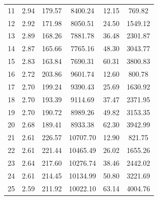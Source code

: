 {\begin{longtable}{|c|c|c|c|c|c|}
    11           & 2.94            & 179.57          & 8400.24             & 12.15           & 769.82              \\
    12           & 2.92            & 171.98          & 8050.51             & 24.50           & 1549.12             \\
    13           & 2.89            & 168.26          & 7881.78             & 36.48           & 2301.87             \\
    14           & 2.87            & 165.66          & 7765.16             & 48.30           & 3043.77             \\
    15           & 2.83            & 163.84          & 7690.31             & 60.31           & 3800.83             \\ \hline
    16           & 2.72            & 203.86          & 9601.74             & 12.60           & 800.78              \\
    17           & 2.70            & 199.24          & 9390.43             & 25.69           & 1630.92             \\
    18           & 2.70            & 193.39          & 9114.69             & 37.47           & 2371.95             \\
    19           & 2.70            & 190.72          & 8989.26             & 49.82           & 3153.35             \\
    20           & 2.68            & 189.41          & 8933.38             & 62.30           & 3942.99             \\ \hline
    21           & 2.61            & 226.57          & 10707.70            & 12.90           & 821.75              \\
    22           & 2.61            & 221.44          & 10465.49            & 26.02           & 1655.26             \\
    23           & 2.64            & 217.60          & 10276.74            & 38.46           & 2442.02             \\
    24           & 2.61            & 214.45          & 10134.99            & 50.80           & 3221.69             \\
    25           & 2.59            & 211.92          & 10022.10            & 63.14           & 4004.76             \\ \hline
\end{longtable}
}

